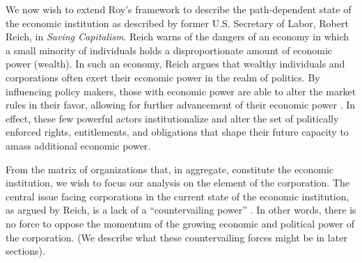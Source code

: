 \documentclass[12pt]{article}
\begin{document}
We now wish to extend Roy's framework to describe the path-dependent state of the economic institution as described by former U.S. Secretary of Labor, Robert Reich, in \textit{Saving Capitalism}. Reich warns of the dangers of an economy in which a small minority of individuals holds a disproportionate amount of economic power (wealth). In such an economy, Reich argues that wealthy individuals and corporations often exert their economic power in the realm of politics. By influencing policy makers, those with economic power are able to alter the market rules in their favor, allowing for further advancement of their economic power \cite[Reich 155]{Reich}. In effect, these few powerful actors institutionalize and alter the set of politically enforced rights, entitlements, and obligations that shape their future capacity to amass additional economic power. 

From the matrix of organizations that, in aggregate, constitute the economic institution, we wish to focus our analysis on the element of the corporation. The central issue facing corporations in the current state of the economic institution, as argued by Reich, is a lack of a ``countervailing power'' \cite[Reich 157]{Reich}. In other words, there is no force to oppose the momentum of the growing economic and political power of the corporation. (We describe what these countervailing forces might be in later sections).
\end{document}
